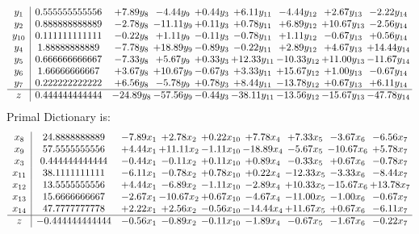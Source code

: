 \documentclass[8pt]{article}
\begin{document}
\[\begin{array}{c| c c@{\hskip 2pt} c@{\hskip 2pt} c@{\hskip 2pt} c@{\hskip 2pt} c@{\hskip 2pt} c@{\hskip 2pt} c@{\hskip 2pt} }
 y_{1}   &  0.555555555556 & +  7.89 y_{8} & -4.44 y_{9} & +  0.44 y_{3} & +  6.11 y_{11} & -4.44 y_{12} & +  2.67 y_{13} & -2.22 y_{14}\\
 y_{2}   &  0.888888888889 & -2.78 y_{8} & -11.11 y_{9} & +  0.11 y_{3} & +  0.78 y_{11} & +  6.89 y_{12} & + 10.67 y_{13} & -2.56 y_{14}\\
 y_{10}   &  0.111111111111 & -0.22 y_{8} & +  1.11 y_{9} & -0.11 y_{3} & -0.78 y_{11} & +  1.11 y_{12} & -0.67 y_{13} & +  0.56 y_{14}\\
 y_{4}   &  1.88888888889 & -7.78 y_{8} & + 18.89 y_{9} & -0.89 y_{3} & -0.22 y_{11} & +  2.89 y_{12} & +  4.67 y_{13} & + 14.44 y_{14}\\
 y_{5}   &  0.666666666667 & -7.33 y_{8} & +  5.67 y_{9} & +  0.33 y_{3} & + 12.33 y_{11} & -10.33 y_{12} & + 11.00 y_{13} & -11.67 y_{14}\\
 y_{6}   &  1.66666666667 & +  3.67 y_{8} & + 10.67 y_{9} & -0.67 y_{3} & +  3.33 y_{11} & + 15.67 y_{12} & +  1.00 y_{13} & -0.67 y_{14}\\
 y_{7}   &  0.222222222222 & +  6.56 y_{8} & -5.78 y_{9} & +  0.78 y_{3} & +  8.44 y_{11} & -13.78 y_{12} & +  0.67 y_{13} & +  6.11 y_{14}\\
\hline
z    &  0.444444444444 & -24.89 y_{8} & -57.56 y_{9} & -0.44 y_{3} & -38.11 y_{11} & -13.56 y_{12} & -15.67 y_{13} & -47.78 y_{14}\\
\end{array}\]
Primal Dictionary is:
\[\begin{array}{c| c c@{\hskip 2pt} c@{\hskip 2pt} c@{\hskip 2pt} c@{\hskip 2pt} c@{\hskip 2pt} c@{\hskip 2pt} c@{\hskip 2pt} }
 x_{8}   &  24.8888888889 & -7.89 x_{1} & +  2.78 x_{2} & +  0.22 x_{10} & +  7.78 x_{4} & +  7.33 x_{5} & -3.67 x_{6} & -6.56 x_{7}\\
 x_{9}   &  57.5555555556 & +  4.44 x_{1} & + 11.11 x_{2} & -1.11 x_{10} & -18.89 x_{4} & -5.67 x_{5} & -10.67 x_{6} & +  5.78 x_{7}\\
 x_{3}   &  0.444444444444 & -0.44 x_{1} & -0.11 x_{2} & +  0.11 x_{10} & +  0.89 x_{4} & -0.33 x_{5} & +  0.67 x_{6} & -0.78 x_{7}\\
 x_{11}   &  38.1111111111 & -6.11 x_{1} & -0.78 x_{2} & +  0.78 x_{10} & +  0.22 x_{4} & -12.33 x_{5} & -3.33 x_{6} & -8.44 x_{7}\\
 x_{12}   &  13.5555555556 & +  4.44 x_{1} & -6.89 x_{2} & -1.11 x_{10} & -2.89 x_{4} & + 10.33 x_{5} & -15.67 x_{6} & + 13.78 x_{7}\\
 x_{13}   &  15.6666666667 & -2.67 x_{1} & -10.67 x_{2} & +  0.67 x_{10} & -4.67 x_{4} & -11.00 x_{5} & -1.00 x_{6} & -0.67 x_{7}\\
 x_{14}   &  47.7777777778 & +  2.22 x_{1} & +  2.56 x_{2} & -0.56 x_{10} & -14.44 x_{4} & + 11.67 x_{5} & +  0.67 x_{6} & -6.11 x_{7}\\
\hline
z    &  -0.444444444444 & -0.56 x_{1} & -0.89 x_{2} & -0.11 x_{10} & -1.89 x_{4} & -0.67 x_{5} & -1.67 x_{6} & -0.22 x_{7}\\
\end{array}\]
\end{document}

